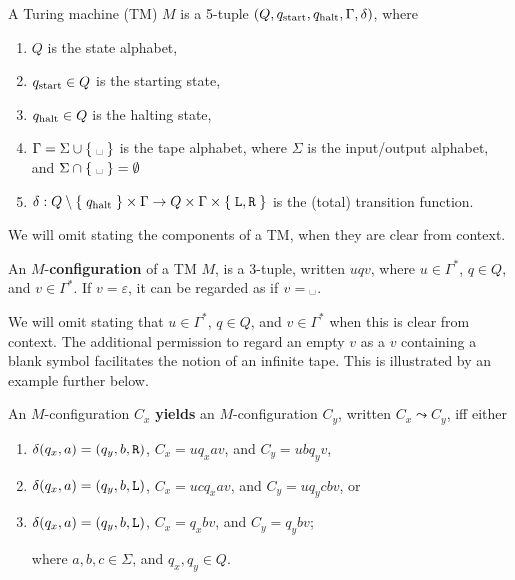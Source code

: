 \begin{definition} A Turing machine (TM) $M$ is a 5-tuple $\mathopen{}\left({Q, q_{\text{start}},
q_{\text{halt}}, \Gamma, \delta}\right)\mathclose{}$, where

\begin{enumerate}

\item $Q$ is the state alphabet,

\item $q_{\text{start}} \in Q$ is the starting state,

\item $q_{\text{halt}} \in Q$ is the halting state,

\item $\Gamma = \Sigma \cup \set{\blank}$ is the tape alphabet, where $\Sigma$
is the input/output alphabet, and $\Sigma \cap \set{\blank} = \emptyset$

\item $\delta : Q \setminus \mathopen{}\left\{\mathrel{}{q_{\text{halt}}}\mathrel{}\right\}\mathclose{} \times \Gamma \rightarrow Q \times
\Gamma \times \mathopen{}\left\{\mathrel{}{\mathtt{L}, \mathtt{R}}\mathrel{}\right\}\mathclose{}$ is the (total) transition function.

\end{enumerate}

We will omit stating the components of a TM, when they are clear from context.

\end{definition}

\begin{definition} An $M$-\textbf{configuration} of a TM $M$, is a 3-tuple,
written $uqv$, where $u\in\Gamma^*$, $q\in Q$, and $v\in\Gamma^*$. If
$v=\varepsilon$, it can be regarded as if $v=\blank$. \end{definition}

We will omit stating that $u\in\Gamma^*$, $q\in Q$, and $v\in\Gamma^*$ when
this is clear from context. The additional permission to regard an empty $v$ as
a $v$ containing a blank symbol facilitates the notion of an infinite tape.
This is illustrated by an example further below.

\begin{definition} An $M$-configuration $C_x$ \textbf{yields} an
$M$-configuration $C_y$, written $C_x\leadsto C_y$, iff either

\begin{enumerate}

\item $\delta\mathopen{}\left({q_x,a}\right)\mathclose{}=\mathopen{}\left({q_y,b,\mathtt{R}}\right)\mathclose{}$, $C_x=uq_xav$, and $C_y=ubq_yv$,

\item $\delta\mathopen{}\left({q_x,a}\right)\mathclose{}=\mathopen{}\left({q_y,b,\mathtt{L}}\right)\mathclose{}$, $C_x=ucq_xav$, and $C_y=uq_ycbv$,
or

\item $\delta\mathopen{}\left({q_x,a}\right)\mathclose{}=\mathopen{}\left({q_y,b,\mathtt{L}}\right)\mathclose{}$, $C_x=q_xbv$,  and $C_y=q_ybv$;

where $a,b,c\in\Sigma$, and $q_x,q_y\in Q$.

\end{enumerate}

\end{definition}

